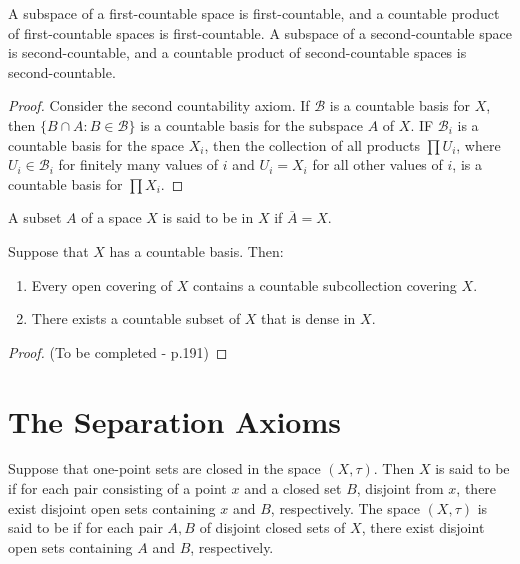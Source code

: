 \documentclass[12pt, a4paper, oneside, openright, titlepage]{book}
\begin{document}
\begin{theorem}
    A subspace of a first-countable space is first-countable, and a countable product of first-countable spaces is first-countable. A subspace of a second-countable space is second-countable, and a countable product of second-countable spaces is second-countable.
\end{theorem}
\begin{proof}
    Consider the second countability axiom. If $\mathcal{B}$ is a countable basis for $X$, then $\{B\cap A:B\in\mathcal{B}\}$ is a countable basis for the subspace $A$ of $X$. IF $\mathcal{B}_i$ is a countable basis for the space $X_i$, then the collection of all products $\prod U_i$, where $U_i \in \mathcal{B}_i$ for finitely many values of $i$ and $U_i = X_i$ for all other values of $i$, is a countable basis for $\prod X_i$.
\end{proof}


\begin{definition}
    A subset $A$ of a space $X$ is said to be  in $X$ if $\overline{A} = X$.
\end{definition}

\begin{theorem}
    Suppose that $X$ has a countable basis. Then: \begin{enumerate}
        \item Every open covering of $X$ contains a countable subcollection covering $X$.
        \item There exists a countable subset of $X$ that is dense in $X$.
    \end{enumerate}
\end{theorem}
\begin{proof}
    (To be completed - p.191)
\end{proof}

\section{The Separation Axioms}

\begin{definition}
    Suppose that one-point sets are closed in the space $(X,\tau)$. Then $X$ is said to be  if for each pair consisting of a point $x$ and a closed set $B$, disjoint from $x$, there exist disjoint open sets containing $x$ and $B$, respectively. The space $(X,\tau)$ is said to be  if for each pair $A,B$ of disjoint closed sets of $X$, there exist disjoint open sets containing $A$ and $B$, respectively.
\end{definition}
\end{document}
